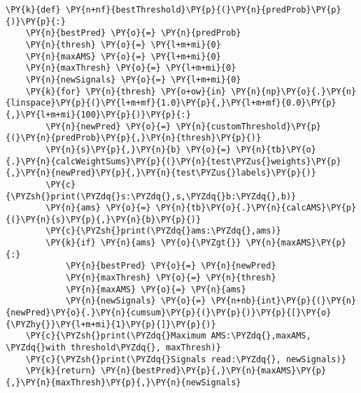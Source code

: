 {\par%
\vspace{-1\baselineskip}%
}%
\begin{notebookcell}[]%
\begin{addmargin}[\cellleftmargin]{0em}%
{\smaller%
\par%
%
\vspace{-1\smallerfontscale}%
\begin{Verbatim}[commandchars=\\\{\}]
\PY{k}{def} \PY{n+nf}{bestThreshold}\PY{p}{(}\PY{n}{predProb}\PY{p}{)}\PY{p}{:}
    \PY{n}{bestPred} \PY{o}{=} \PY{n}{predProb}
    \PY{n}{thresh} \PY{o}{=} \PY{l+m+mi}{0}
    \PY{n}{maxAMS} \PY{o}{=} \PY{l+m+mi}{0}
    \PY{n}{maxThresh} \PY{o}{=} \PY{l+m+mi}{0}
    \PY{n}{newSignals} \PY{o}{=} \PY{l+m+mi}{0}
    \PY{k}{for} \PY{n}{thresh} \PY{o+ow}{in} \PY{n}{np}\PY{o}{.}\PY{n}{linspace}\PY{p}{(}\PY{l+m+mf}{1.0}\PY{p}{,}\PY{l+m+mf}{0.0}\PY{p}{,}\PY{l+m+mi}{100}\PY{p}{)}\PY{p}{:}
        \PY{n}{newPred} \PY{o}{=} \PY{n}{customThreshold}\PY{p}{(}\PY{n}{predProb}\PY{p}{,}\PY{n}{thresh}\PY{p}{)}
        \PY{n}{s}\PY{p}{,}\PY{n}{b} \PY{o}{=} \PY{n}{tb}\PY{o}{.}\PY{n}{calcWeightSums}\PY{p}{(}\PY{n}{test\PYZus{}weights}\PY{p}{,}\PY{n}{newPred}\PY{p}{,}\PY{n}{test\PYZus{}labels}\PY{p}{)}
        \PY{c}{\PYZsh{}print(\PYZdq{}s:\PYZdq{},s,\PYZdq{}b:\PYZdq{},b)}
        \PY{n}{ams} \PY{o}{=} \PY{n}{tb}\PY{o}{.}\PY{n}{calcAMS}\PY{p}{(}\PY{n}{s}\PY{p}{,}\PY{n}{b}\PY{p}{)}
        \PY{c}{\PYZsh{}print(\PYZdq{}ams:\PYZdq{},ams)}
        \PY{k}{if} \PY{n}{ams} \PY{o}{\PYZgt{}} \PY{n}{maxAMS}\PY{p}{:}
            \PY{n}{bestPred} \PY{o}{=} \PY{n}{newPred}
            \PY{n}{maxThresh} \PY{o}{=} \PY{n}{thresh}
            \PY{n}{maxAMS} \PY{o}{=} \PY{n}{ams}
            \PY{n}{newSignals} \PY{o}{=} \PY{n+nb}{int}\PY{p}{(}\PY{n}{newPred}\PY{o}{.}\PY{n}{cumsum}\PY{p}{(}\PY{p}{)}\PY{p}{[}\PY{o}{\PYZhy{}}\PY{l+m+mi}{1}\PY{p}{]}\PY{p}{)}
    \PY{c}{\PYZsh{}print(\PYZdq{}Maximum AMS:\PYZdq{},maxAMS, \PYZdq{}with threshold\PYZdq{}, maxThresh)}
    \PY{c}{\PYZsh{}print(\PYZdq{}Signals read:\PYZdq{}, newSignals)}
    \PY{k}{return} \PY{n}{bestPred}\PY{p}{,}\PY{n}{maxAMS}\PY{p}{,}\PY{n}{maxThresh}\PY{p}{,}\PY{n}{newSignals}
\end{Verbatim}
%
\par%
\vspace{-1\smallerfontscale}}%
\end{addmargin}
\end{notebookcell}


